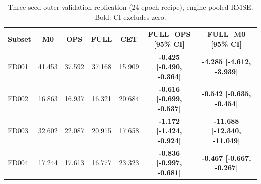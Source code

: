 \begin{table}[t]
\centering
\caption{Three-seed outer-validation replication (24-epoch recipe), engine-pooled RMSE. Bold: CI excludes zero.}
\label{tab:replication}
\begin{tabular}{lcccccc}
\toprule
Subset & M0 & OPS & FULL & CET & FULL$-$OPS [95\% CI] & FULL$-$M0 [95\% CI] \\
\midrule
FD001 & 41.453 & 37.592 & 37.168 & 15.909 & \textbf{-0.425 [-0.490, -0.364]} & \textbf{-4.285 [-4.612, -3.939]} \\
FD002 & 16.863 & 16.937 & 16.321 & 20.684 & \textbf{-0.616 [-0.699, -0.537]} & \textbf{-0.542 [-0.635, -0.454]} \\
FD003 & 32.602 & 22.087 & 20.915 & 17.658 & \textbf{-1.172 [-1.424, -0.924]} & \textbf{-11.688 [-12.340, -11.049]} \\
FD004 & 17.244 & 17.613 & 16.777 & 23.323 & \textbf{-0.836 [-0.997, -0.681]} & \textbf{-0.467 [-0.667, -0.267]} \\
\bottomrule
\end{tabular}
\end{table}
